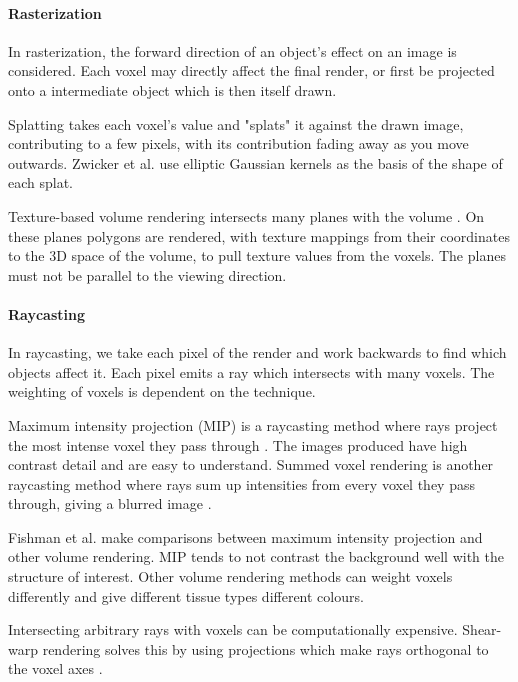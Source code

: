 \documentclass[11p, titlepage]{article}
\begin{document}
\paragraph{Rasterization}

In rasterization, the forward direction of an object's effect on an image is considered. Each voxel may directly affect the final render, or first be projected onto a intermediate object which is then itself drawn.

Splatting takes each voxel's value and "splats" it against the drawn image, contributing to a few pixels, with its contribution fading away as you move outwards. Zwicker et al. \cite{zwicker2002ewa} use elliptic Gaussian kernels as the basis of the shape of each splat.

Texture-based volume rendering intersects many planes with the volume \cite{ohiotexture}. On these planes polygons are rendered, with texture mappings from their coordinates to the 3D space of the volume, to pull texture values from the voxels. The planes must not be parallel to the viewing direction.

\paragraph{Raycasting}

In raycasting, we take each pixel of the render and work backwards to find which objects affect it. Each pixel emits a ray which intersects with many voxels. The weighting of voxels is dependent on the technique.

Maximum intensity projection (MIP) is a raycasting method where rays project the most intense voxel they pass through \cite{birkfellner2016applied}. The images produced have high contrast detail and are easy to understand. Summed voxel rendering is another raycasting method where rays sum up intensities from every voxel they pass through, giving a blurred image \cite{birkfellner2016applied}.

Fishman et al. \cite{fishman2006volume} make comparisons between maximum intensity projection and other volume rendering. MIP tends to not contrast the background well with the structure of interest. Other volume rendering methods can weight voxels differently and give different tissue types different colours. 

Intersecting arbitrary rays with voxels can be computationally expensive. Shear-warp rendering solves this by using projections which make rays orthogonal to the voxel axes \cite{lacroute1994fast}. 
\end{document}
